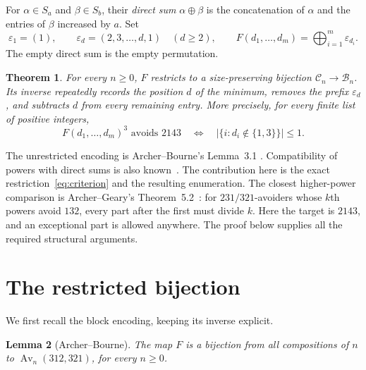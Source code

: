 \documentclass[11pt]{article}
\newtheorem{theorem}{Theorem}
\newtheorem{lemma}[theorem]{Lemma}
\newcommand{\Av}{\operatorname{Av}}
\newcommand{\eps}{\varepsilon}
\newcommand{\C}{\mathcal C}
\newcommand{\B}{\mathcal B}
\begin{document}
For $\alpha\in S_a$ and $\beta\in S_b$, their \emph{direct sum}
$\alpha\oplus\beta$ is the concatenation of $\alpha$ and the entries of
$\beta$ increased by $a$. Set
\[
\eps_1=(1),\qquad \eps_d=(2,3,\ldots,d,1)\quad(d\geq2),\qquad
F(d_1,\ldots,d_m)=\bigoplus_{i=1}^{m}\eps_{d_i}.
\]
The empty direct sum is the empty permutation.

\begin{theorem}\label{thm:main}
For every $n\geq0$, $F$ restricts to a size-preserving bijection
$\C_n\longrightarrow\B_n$. Its inverse repeatedly records the position
$d$ of the minimum, removes the prefix $\eps_d$, and subtracts $d$
from every remaining entry. More precisely, for every finite list of
positive integers,
\begin{equation}\label{eq:criterion}
F(d_1,\ldots,d_m)^3\text{ avoids }2143
\quad\Longleftrightarrow\quad
|\{i:d_i\notin\{1,3\}\}|\leq1.
\end{equation}
\end{theorem}

The unrestricted encoding is Archer--Bourne's Lemma~3.1
\cite{ArcherBourne2026}. Compatibility of powers with direct sums is
also known~\cite[Lemma~2.1]{ArcherGeary2024}. The contribution here is
the exact restriction~\eqref{eq:criterion} and the resulting enumeration.
The closest higher-power comparison is Archer--Geary's
Theorem~5.2~\cite{ArcherGeary2024}: for $231/321$-avoiders whose
$k$th powers avoid $132$, every part after the first must divide $k$.
Here the target is $2143$, and an exceptional part is allowed anywhere.
The proof below supplies all the required structural arguments.

\section{The restricted bijection}

We first recall the block encoding, keeping its inverse explicit.

\begin{lemma}[Archer--Bourne]\label{lem:encoding}
The map $F$ is a bijection from all compositions of $n$ to
$\Av_n(312,321)$, for every $n\geq0$.
\end{lemma}
\end{document}
